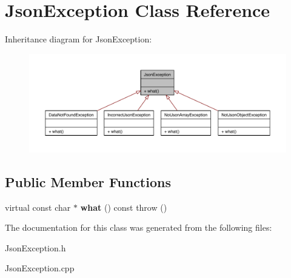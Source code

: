\hypertarget{class_json_exception}{\section{Json\-Exception Class Reference}
\label{class_json_exception}
}


Inheritance diagram for Json\-Exception\-:\nopagebreak
\begin{figure}[H]
\begin{center}
\leavevmode
\includegraphics[width=350pt]{class_json_exception__inherit__graph}
\end{center}
\end{figure}
\subsection*{Public Member Functions}
\begin{DoxyCompactItemize}
\item 
\hypertarget{class_json_exception_a964d4111c787ab522aff9725bf129e52}{virtual const char $\ast$ {\bfseries what} () const   throw ()}\label{class_json_exception_a964d4111c787ab522aff9725bf129e52}

\end{DoxyCompactItemize}


The documentation for this class was generated from the following files\-:\begin{DoxyCompactItemize}
\item 
Json\-Exception.\-h\item 
Json\-Exception.\-cpp\end{DoxyCompactItemize}

